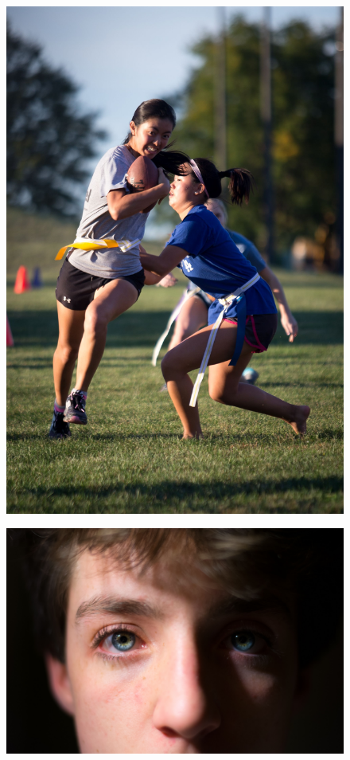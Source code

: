 \documentclass{report}
\begin{document}
\begin{figure}
  \centering
  \includegraphics[width=\textwidth]{res/sport_grace.jpg}
\end{figure}

\begin{landscape}
  \begin{figure}
    \centering
    \includegraphics[height=\textheight]{res/port_tyson.jpg}
  \end{figure}
\end{landscape}
\end{document}
